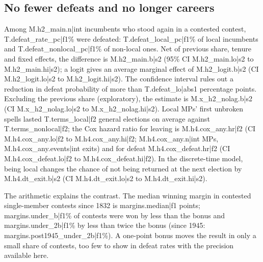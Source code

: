 \documentclass[11pt,a4paper]{article}
\begin{document}
\subsection{No fewer defeats and no longer careers}
Among {{M.h2_main.n|int}} incumbents who stood again in a contested contest, {{T.defeat_rate_pc|f1}}\% were defeated: {{T.defeat_local_pc|f1}}\% of local incumbents and {{T.defeat_nonlocal_pc|f1}}\% of non-local ones. Net of previous share, tenure and fixed effects, the difference is {{M.h2_main.b|s2}} (95\% CI {{M.h2_main.lo|s2}} to {{M.h2_main.hi|s2}}); a logit gives an average marginal effect of {{M.h2_logit.b|s2}} (CI {{M.h2_logit.lo|s2}} to {{M.h2_logit.hi|s2}}). The confidence interval rules out a reduction in defeat probability of more than {{T.defeat_lo|abs1}} percentage points. Excluding the previous share (exploratory), the estimate is {{M.x_h2_nolag.b|s2}} (CI {{M.x_h2_nolag.lo|s2}} to {{M.x_h2_nolag.hi|s2}}). Local MPs' first unbroken spells lasted {{T.terms_local|f2}} general elections on average against {{T.terms_nonlocal|f2}}; the Cox hazard ratio for leaving is {{M.h4.cox_any.hr|f2}} (CI {{M.h4.cox_any.lo|f2}} to {{M.h4.cox_any.hi|f2}}; {{M.h4.cox_any.n|int}} MPs, {{M.h4.cox_any.events|int}} exits) and for defeat {{M.h4.cox_defeat.hr|f2}} (CI {{M.h4.cox_defeat.lo|f2}} to {{M.h4.cox_defeat.hi|f2}}). In the discrete-time model, being local changes the chance of not being returned at the next election by {{M.h4.dt_exit.b|s2}} (CI {{M.h4.dt_exit.lo|s2}} to {{M.h4.dt_exit.hi|s2}}).

The arithmetic explains the contrast. The median winning margin in contested single-member contests since 1832 is {{margins.median|f1}} points; {{margins.under_b|f1}}\% of contests were won by less than the bonus and {{margins.under_2b|f1}}\% by less than twice the bonus (since 1945: {{margins.post1945_under_2b|f1}}\%). A one-point bonus moves the result in only a small share of contests, too few to show in defeat rates with the precision available here.
\end{document}

